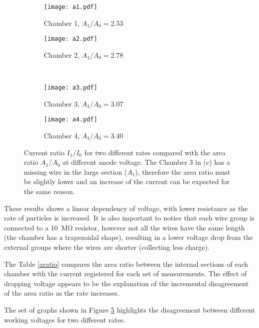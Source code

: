 \begin{figure}[hb]
		\hspace*{\fill}
		\begin{subfigure}[b]{0.45\textwidth}
			\centering
			\texttt{[image: a1.pdf]}
			\caption{Chamber 1, $A_1/A_0=$2.53}\label{fig:a1}
		\end{subfigure}
		\hfill
		\begin{subfigure}[b]{0.45\textwidth}
			\centering
			\texttt{[image: a2.pdf]}
			\caption{Chamber 2, $A_1/A_0=$2.78}\label{fig:a2}
		\end{subfigure}
		\hspace*{\fill}\\
		\hspace*{\fill}
		\begin{subfigure}[b]{0.45\textwidth}
			\centering
			\texttt{[image: a3.pdf]}
			\caption{Chamber 3, $A_1/A_0=$3.07}\label{fig:a3}
		\end{subfigure}
		\hfill
		\begin{subfigure}[b]{0.45\textwidth}
			\centering
			\texttt{[image: a4.pdf]}
			\caption{Chamber 4, $A_1/A_0=$3.40}\label{fig:a4}
		\end{subfigure}
		\hspace*{\fill}
		\captionsetup{margin=1cm}
		\caption{Current ratio $I_1/I_0$ for two different rates compared with the area ratio $A_1/A_0$ at different anode
		voltage. The Chamber 3 in (c) has a missing wire in the large section ($A_1$), therefore the area ratio
		must be slightly lower and an increase of the current can be expected for the same reason.}\label{plotratios}
\end{figure}

These results shows a linear dependency of voltage, with lower resistance as the rate of particles is increased. It is
also important to notice that each wire group is connected to a \SI{10}{\mega\ohm} resistor, however not all the wires
have the same length (the chamber has a trapezoidal shape), resulting in a lower voltage drop from the external groups where the
wires are shorter (collecting less charge).\par

The Table \ref{aratio} compares the area ratio between the internal sections of each chamber with the current registered
for each set of measurements. The effect of dropping voltage appears to be the explanation of the incremental
disagreement of the area ratio as the rate increases.\par
The set of graphs shown in Figure \ref{plotratios} highlights the
disagreement between different working voltages for two different rates. 


